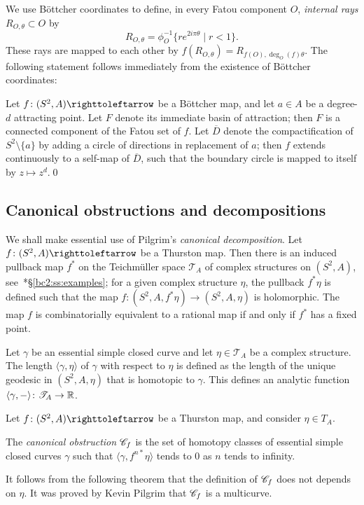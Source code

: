 \documentclass{amsart}
\begin{document}
We use B\"ottcher coordinates to define, in every Fatou component $O$,
\emph{internal rays} $R_{O,\theta}\subset O$ by
\[R_{O,\theta}=\phi_O^{-1}\{r e^{2i\pi\theta}\mid r<1\}.
\]
These rays are mapped to each other by
$f(R_{O,\theta})=R_{f(O),\deg_O(f)\theta}$.  The following statement
follows immediately from the existence of B\"ottcher coordinates:
\begin{lem}\label{lem:Bottcher extension}
  Let $f\colon(S^2,A)\selfmap$ be a B\"ottcher map, and let $a\in A$
  be a degree-$d$ attracting point. Let $F$ denote its immediate basin
  of attraction; then $F$ is a connected component of the Fatou set of
  $f$. Let $\overline D$ denote the compactification of
  $S^2\setminus\{a\}$ by adding a circle of directions in replacement
  of $a$; then $f$ extends continuously to a self-map of
  $\overline D$, such that the boundary circle is mapped to itself by
  $z\mapsto z^d$.\qed
\end{lem}

\subsection{Canonical obstructions and decompositions}
We shall make essential use of Pilgrim's \emph{canonical
  decomposition}. Let $f\colon (S^2,A)\selfmap$ be a Thurston
map. Then there is an induced pullback map $f^*$ on the Teichm\"uller
space $\mathscr T_A$ of complex structures on $(S^2,A)$,
see~\cite{bartholdi-dudko:bc2}*{\S\ref{bc2:ss:examples}}; for a given
complex structure $\eta$, the pullback $f^*\eta$ is defined such that
the map $f\colon (S^2,A,f^*\eta)\to(S^2,A,\eta)$ is holomorphic. The
map $f$ is combinatorially equivalent to a rational map if and only if
$f^*$ has a fixed point.

Let $\gamma$ be an essential simple closed curve and let
$\eta\in \mathscr T_A$ be a complex structure. The length
$\langle\gamma , \eta\rangle$ of $\gamma$ with respect to $\eta$ is
defined as the length of the unique geodesic in $(S^2,A,\eta)$ that is
homotopic to $\gamma$. This defines an analytic function
$\langle\gamma,{-}\rangle\colon \mathscr T_A\to {\mathbb R}$. 

\begin{defn}
  Let $f\colon (S^2,A)\selfmap$ be a Thurston map, and consider
  $\eta \in T_A$.

  The \emph{canonical obstruction} ${\mathscr C}_f$ is the set of homotopy
  classes of essential simple closed curves $\gamma$ such that
  $\langle\gamma,f^{n*}\eta\rangle$ tends to $0$ as $n$ tends to
  infinity.
\end{defn}
It follows from the following theorem that the definition of ${\mathscr C}_f$
does not depends on $\eta$. It was proved by Kevin Pilgrim that
${\mathscr C}_f$ is a multicurve.
\end{document}
